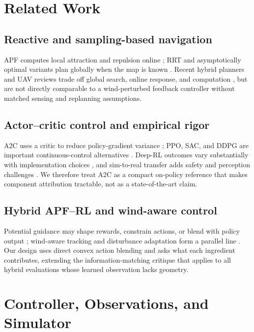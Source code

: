 \documentclass[conference]{IEEEtran}
\begin{document}
\section{Related Work}
\subsection{Reactive and sampling-based navigation}
APF computes local attraction and repulsion online \cite{khatib1986real}; RRT and asymptotically optimal variants
plan globally when the map is known \cite{lavalle1998rrt,karaman2011sampling}. Recent hybrid planners and UAV
reviews trade off global search, online response, and computation \cite{zheng2025uav,li2024gapf}, but are not
directly comparable to a wind-perturbed feedback controller without matched sensing and replanning assumptions.
\subsection{Actor--critic control and empirical rigor}
A2C uses a critic to reduce policy-gradient variance \cite{mnih2016a3c}; PPO, SAC, and DDPG are important
continuous-control alternatives \cite{schulman2017ppo,haarnoja2018sac,lillicrap2016ddpg}. Deep-RL outcomes vary
substantially with implementation choices \cite{henderson2018deep}, and sim-to-real transfer adds safety and
perception challenges \cite{dulac2021challenges,tobin2017domain}. We therefore treat A2C as a compact on-policy
reference that makes component attribution tractable, not as a state-of-the-art claim.
\subsection{Hybrid APF--RL and wind-aware control}
Potential guidance may shape rewards, constrain actions, or blend with policy output
\cite{jin2025hybrid,xiao2025vapf,lee2025apfppo}; wind-aware tracking and disturbance adaptation form a parallel
line \cite{wu2024wind,neuralfly2022,datt2021,mellinger2011minimum}. Our design uses direct convex action blending
and asks what each ingredient contributes, extending the information-matching critique that applies to all
hybrid evaluations whose learned observation lacks geometry.

\section{Controller, Observations, and Simulator}
\end{document}
